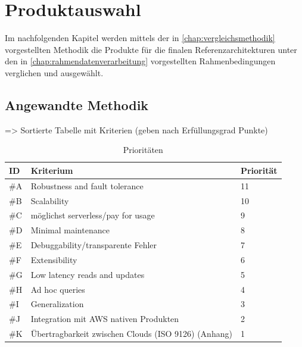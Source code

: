 \chapter{Produktauswahl}
Im nachfolgenden Kapitel werden mittels der in \autoref{chap:vergleichsmethodik} vorgestellten Methodik die Produkte für die finalen Referenzarchitekturen unter den in \autoref{chap:rahmendatenverarbeitung} vorgestellten Rahmenbedingungen verglichen und ausgewählt.

\section{Angewandte Methodik}
=> Sortierte Tabelle mit Kriterien (geben nach Erfüllungsgrad Punkte)
\begin{table}[H]
\centering
\begin{tabular}{|l|l|l|}
\hline
ID & Kriterium & Priorität \\ \hline
\#A & Robustness and fault tolerance & 11 \\ \hline
\#B & Scalability & 10 \\ \hline
\#C & möglichst serverless/pay for usage & 9 \\ \hline
\#D & Minimal maintenance & 8 \\ \hline
\#E & Debuggability/transparente Fehler & 7 \\ \hline
\#F & Extensibility & 6 \\ \hline
\#G & Low latency reads and updates & 5 \\ \hline
\#H & Ad hoc queries & 4 \\ \hline
\#I & Generalization & 3 \\ \hline
\#J & Integration mit AWS nativen Produkten & 2 \\ \hline
\#K & Übertragbarkeit zwischen Clouds (ISO 9126) (Anhang) & 1 \\ \hline
\end{tabular}
\caption{Prioritäten}
\label{tab:prioritaeten}
\end{table}


